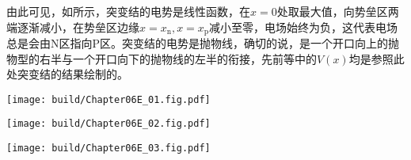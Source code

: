 由此可见，如所示，突变结的电势是线性函数，在$x=0$处取最大值，向势垒区两端逐渐减小，在势垒区边缘$x=x_\text{n}, x=x_\text{p}$减小至零，电场始终为负，这代表电场总是会由N区指向P区。突变结的电势是抛物线，确切的说，是一个开口向上的抛物型的右半与一个开口向下的抛物线的左半的衔接，先前等中的$V(x)$均是参照此处突变结的结果绘制的。

\begin{Figure}[突变结]
    \begin{FigureSub}[突变结的电荷密度]
        \texttt{[image: build/Chapter06E\_01.fig.pdf]}
    \end{FigureSub}
    \begin{FigureSub}[突变结的电场]
        \texttt{[image: build/Chapter06E\_02.fig.pdf]}
    \end{FigureSub}
    \begin{FigureSub}[突变结的电势]
        \texttt{[image: build/Chapter06E\_03.fig.pdf]}
    \end{FigureSub}
\end{Figure}

